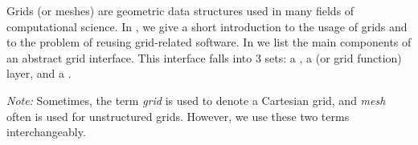 Grids (or meshes) are geometric data structures used in many fields
of computational science.
In ,
we give a short introduction to the usage of grids
and to the problem of reusing grid-related software.
In 
we list the main components of an abstract grid interface.
This interface falls into 3 sets:
a ,
a  (or grid function) layer,
and a .

\emph{Note:} Sometimes, the term \emph{grid} is used to denote a Cartesian grid,
and \emph{mesh} often is used for unstructured grids. However, we use these two terms
interchangeably.
